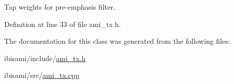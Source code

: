 Tap weights for pre-\/emphasis filter. 



Definition at line 33 of file ami\+\_\+tx.\+h.



The documentation for this class was generated from the following files\+:\begin{DoxyCompactItemize}
\item 
ibisami/include/\hyperlink{ami__tx_8h}{ami\+\_\+tx.\+h}\item 
ibisami/src/\hyperlink{ami__tx_8cpp}{ami\+\_\+tx.\+cpp}\end{DoxyCompactItemize}
